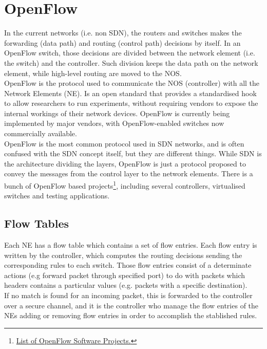 \section{OpenFlow}
\label{sec:openflow}

In the current networks (i.e. non SDN), the routers and switches makes the forwarding (data path) and routing (control path) decisions by itself. In an OpenFlow switch, those decisions are divided between the network element (i.e. the switch) and the controller. Such division keeps the data path on the network element, while high-level routing are moved to the NOS.\\

OpenFlow is the protocol used to communicate the NOS (controller) with all the Network Elements (NE). Is an open standard that provides a standardised hook to allow researchers to run experiments, without requiring vendors to expose the internal workings of their network devices. OpenFlow is currently being implemented by major vendors, with OpenFlow-enabled switches now commercially available.\\

OpenFlow is the most common protocol used in SDN networks, and is often confused with the SDN concept itself, but they are different things. While SDN is the architecture dividing the layers, OpenFlow is just a protocol proposed to convey the messages from the control layer to the network elements. There is a bunch of OpenFlow based projects\footnote{\href{http://yuba.stanford.edu/~casado/of-sw.html}{List of OpenFlow Software Projects.}}, including several controllers, virtualised switches and testing applications.  \\

\subsection{Flow Tables}

Each NE has a flow table which contains a set of flow entries. Each flow entry is written by the controller, which computes the routing decisions sending the corresponding rules to each switch. Those flow entries consist of a determinate actions (e.g forward packet through specified port) to do with packets which headers contains a particular values (e.g. packets with a specific destination).\\

If no match is found for an incoming packet, this is forwarded to the controller over a secure channel, and it is the controller who manage the flow entries of the NEs adding or removing flow entries in order to accomplish the stablished rules.

